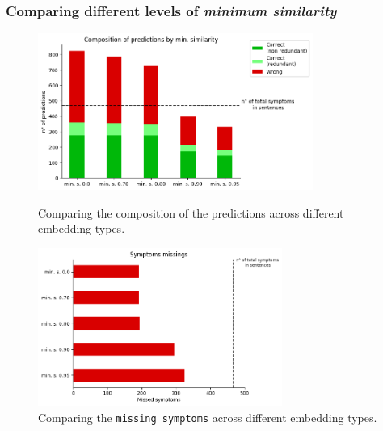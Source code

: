 



\newpage
\subsubsection{Comparing different levels of \textit{minimum similarity}}
\begin{figure}[h]%
  \centering
  \begin{minipage}[b]{0.4\textwidth}
    \includegraphics[width=9cm]{graphs/comparison_min_similarity}
    \caption{Comparing the composition of the predictions across different embedding types.}
  \end{minipage}
  \hfill
  \begin{minipage}[b]{0.4\textwidth}
    \includegraphics[width=8cm]{graphs/comparison_min_similarity_missings}
    \caption{Comparing the \texttt{missing symptoms} across different embedding types.}
  \end{minipage}
\end{figure}

